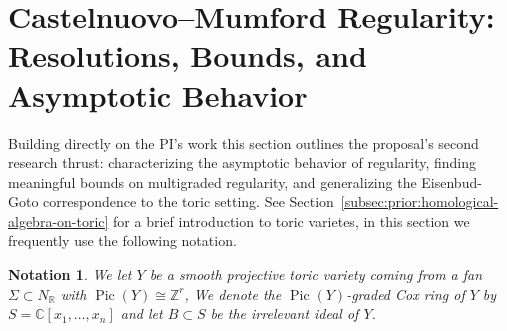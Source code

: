 \documentclass[11pt,reqno]{amsart}
\newtheorem{problem}[lemma]{Research Problem}
\newtheorem{notation}[lemma]{Notation}
\theoremstyle{remark}
\newcommand{\Pic}{\operatorname{Pic}}
\newcommand{\CC}{\mathbb{C}}
\newcommand{\PP}{\mathbb{P}}
\newcommand{\RR}{\mathbb{R}}
\newcommand{\VV}{\mathbb{V}}
\newcommand{\ZZ}{\mathbb{Z}}
\newcommand{\cO}{\mathcal{O}}
\newcommand{\cP}{\mathcal{P}}
\begin{document}
%
%


	
\section{Castelnuovo–Mumford Regularity: Resolutions, Bounds, and Asymptotic Behavior}\label{sec:multigraded-regularity}

Building directly on the PI's work \cite{bruceHellerSayrafi21,bruceHellerSayrafi22} this section outlines the proposal's second research thrust: characterizing the asymptotic behavior of regularity, finding meaningful bounds on multigraded regularity, and generalizing the Eisenbud-Goto correspondence to the toric setting. See Section~\ref{subsec:prior:homological-algebra-on-toric} for a brief introduction to toric varietes, in this section we frequently use the following notation. 


\begin{notation}\label{not:toric}
	We let $Y$ be a smooth projective toric variety coming from a fan $\Sigma \subset N_{\RR}$ with $\Pic(Y) \cong \ZZ^r$, We denote the $\Pic(Y)$-graded Cox ring of $Y$ by $S=\CC[x_1,\ldots,x_n]$ and let $B\subset S$ be the irrelevant ideal of $Y$. 
\end{notation}
\end{document}
